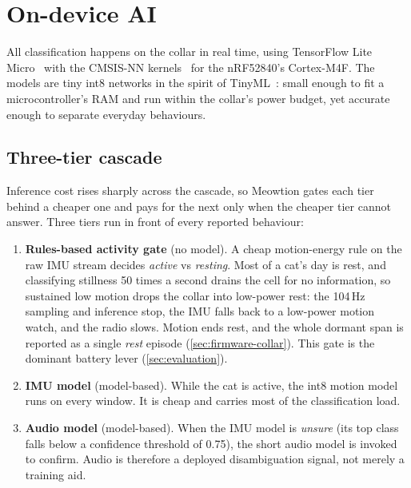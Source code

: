 \section{On-device AI}
\label{sec:on-device-ai}

All classification happens on the collar in real time, using TensorFlow Lite
Micro~\cite{david2021tflm} with the CMSIS-NN kernels~\cite{lai2018cmsisnn} for the nRF52840's
Cortex-M4F. The models are tiny int8 networks in the spirit of TinyML~\cite{warden2019tinyml}: small
enough to fit a microcontroller's RAM and run within the collar's power budget, yet accurate enough to
separate everyday behaviours.

\subsection{Three-tier cascade}

Inference cost rises sharply across the cascade, so Meowtion gates each tier behind a cheaper one and
pays for the next only when the cheaper tier cannot answer. Three tiers run in front of every reported
behaviour:

\begin{enumerate}[leftmargin=1.6em,itemsep=2pt]
  \item \textbf{Rules-based activity gate} (no model). A cheap motion-energy rule on the raw IMU
        stream decides \emph{active} vs \emph{resting}. Most of a cat's day is rest, and classifying
        stillness 50 times a second drains the cell for no information, so sustained low motion drops
        the collar into low-power rest: the 104\,Hz sampling and inference stop, the IMU falls back to
        a low-power motion watch, and the radio slows. Motion ends rest, and the whole dormant span is
        reported as a single \emph{rest} episode (\cref{sec:firmware-collar}). This gate is the
        dominant battery lever (\cref{sec:evaluation}).
  \item \textbf{IMU model} (model-based). While the cat is active, the int8 motion model runs on every
        window. It is cheap and carries most of the classification load.
  \item \textbf{Audio model} (model-based). When the IMU model is \emph{unsure} (its top class falls
        below a confidence threshold of 0.75), the short audio model is invoked to confirm. Audio is
        therefore a deployed disambiguation signal, not merely a training aid.
\end{enumerate}

